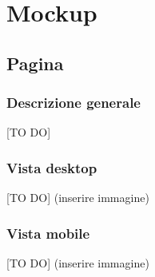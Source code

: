 %
%

\appendix


\section{Mockup} %
\label{sec:desc_dp}
	\subsection{Pagina} %
	\label{sub:pagina}
		\subsubsection{Descrizione generale} %
		\label{ssub:descrizione_generale}
		[TO DO]

		\subsubsection{Vista desktop} %
		\label{ssub:vista_desktop}
		[TO DO] (inserire immagine)

		\subsubsection{Vista mobile} %
		\label{ssub:vista_mobile}
		[TO DO] (inserire immagine)
